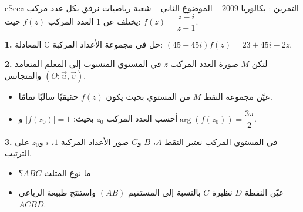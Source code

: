 \documentclass[12pt,a4paper]{article}
\newenvironment{BOX}[2]{\begin{otherlanguage}{english}\begin{arbox}{#1}{#2}}{\end{arbox}\end{otherlanguage}}
\newcounter{exo}
\newenvironment{tamrin}[1]{\stepcounter{exo}\begin{BOX}{cSec}{التمرين \theexo: #1}}{\end{BOX}}
\newenvironment{sq}{\begin{itemize}[leftmargin=2.4em,itemsep=3pt]}{\end{itemize}}
\newcommand{\qa}{\item[(أ)]}\newcommand{\qb}{\item[(ب)]}\newcommand{\qc}{\item[(جـ)]}\newcommand{\qd}{\item[(د)]}\newcommand{\qe}{\item[(هـ)]}
\newcommand{\QQ}[1]{\par\smallskip\textbf{#1.} }
\begin{document}
\begin{tamrin}{بكالوريا 2009 -- الموضوع الثاني -- شعبة رياضيات}
نرفق بكل عدد مركب $z$ يختلف عن $1$ العدد المركب $f(z)$ حيث: $f(z)=\dfrac{z-i}{z-1}$.
\QQ{1} حل في مجموعة الأعداد المركبة $\mathbb C$ المعادلة: $(45+45i)f(z)=23+45i-2z$.
\QQ{2} لتكن $M$ صورة العدد المركب $z$ في المستوي المنسوب إلى المعلم المتعامد والمتجانس $(O;\vec u,\vec v)$.
\begin{sq}
\qa عيّن مجموعة النقط $M$ من المستوي بحيث يكون $f(z)$ حقيقيًا سالبًا تمامًا.
\qb أحسب العدد المركب $z_0$ بحيث: $|f(z_0)|=1$ و$\arg\left(f(z_0)\right)=\dfrac{3\pi}{2}$.
\end{sq}
\QQ{3} في المستوي المركب نعتبر النقط $A$، $B$ و$C$ صور الأعداد المركبة $1$، $i$ و$z_0$ على الترتيب.
\begin{sq}
\qa ما نوع المثلث $ABC$؟
\qb عيّن النقطة $D$ نظيرة $C$ بالنسبة إلى المستقيم $(AB)$ واستنتج طبيعة الرباعي $ACBD$.
\end{sq}
\end{tamrin}
\end{document}
